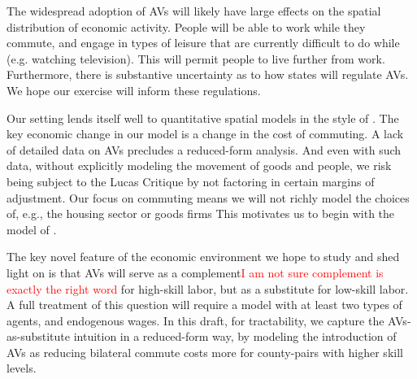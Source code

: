 \documentclass{article}
\begin{document}
The widespread adoption of AVs will likely have large effects on the spatial distribution of economic activity. People will be able to work while they commute, and engage in types of leisure that are currently difficult to do while (e.g. watching television). This will permit people to live further from work.
Furthermore, there is substantive uncertainty as to how states will regulate AVs. We hope our exercise will inform these regulations.

Our setting lends itself well to quantitative spatial models in the style of \citep{redding_quantitative_2017}. The key economic change in our model is a change in the cost of commuting. 
A lack of detailed data on AVs precludes a reduced-form analysis. And even with such data, without explicitly modeling the movement of goods and people, we risk being subject to the Lucas Critique by not factoring in certain margins of adjustment. 
Our focus on commuting means we will not richly model the choices of, e.g., the housing sector or goods firms This motivates us to begin with the model of \citep{monte_commuting_2018}.

The key novel feature of the economic environment we hope to study and shed light on is that AVs will serve as a complement\textcolor{red}{I am not sure complement is exactly the right word} for high-skill labor, but as a substitute for low-skill labor. 
A full treatment of this question will require a model with at least two types of agents, and endogenous wages. In this draft, for tractability, we capture the AVs-as-substitute intuition in a reduced-form way, by modeling the introduction of AVs as reducing bilateral commute costs more for county-pairs with higher skill levels. 



 



\end{document}

